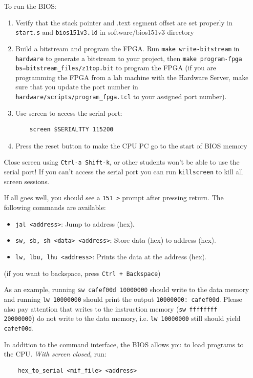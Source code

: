 \documentclass[11pt]{article}
\begin{document}
To run the BIOS:
\begin{enumerate}
  \item Verify that the stack pointer and .text segment offset are set properly in \verb|start.s| and \verb|bios151v3.ld| in software/bios151v3 directory
  \item Build a bitstream and program the FPGA. Run \verb|make write-bitstream| in \verb|hardware| to generate a bitstream to your project, then \verb|make program-fpga bs=bitstream_files/z1top.bit| to program the FPGA (if you are programming the FPGA from a lab machine with the Hardware Server, make sure that you update the port number in \verb|hardware/scripts/program_fpga.tcl| to your assigned port number).
  \item Use screen to access the serial port:
    \begin{verbatim}
    screen $SERIALTTY 115200
    \end{verbatim}
  \item Press the reset button to make the CPU PC go to the start of BIOS memory
\end{enumerate}

Close screen using \verb|Ctrl-a Shift-k|, or other students won't be able to use the serial port!
If you can't access the serial port you can run \verb|killscreen| to kill all screen sessions.

If all goes well, you should see a \verb|151 >| prompt after pressing return. The following commands are available:
\begin{itemize}
    \item \verb|jal <address>|: Jump to address (hex).
    \item \verb|sw, sb, sh <data> <address>|: Store data (hex) to address (hex).
    \item \verb|lw, lbu, lhu <address>|: Prints the data at the address (hex).
\end{itemize}

(if you want to backspace, press \verb|Ctrl + Backspace|)

As an example, running \verb|sw cafef00d 10000000| should write to the data memory and running \verb|lw 10000000| should print the output \verb|10000000: cafef00d|.
Please also pay attention that writes to the instruction memory (\verb|sw ffffffff 20000000|) do not write to the data memory, i.e. \verb|lw 10000000| still should yield \verb|cafef00d|.

In addition to the command interface, the BIOS allows you to load programs to the CPU. \textit{With screen closed}, run:
\begin{verbatim}
    hex_to_serial <mif_file> <address>
\end{verbatim}
\end{document}
